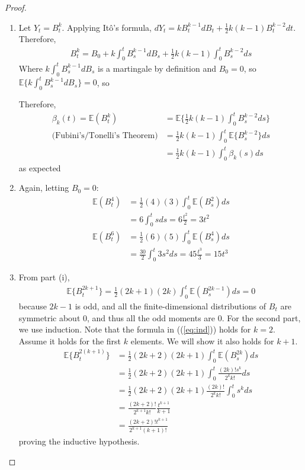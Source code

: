 \documentclass[11pt]{article}
\newcommand{\gb}{\beta}
\newcommand{\E}{\mathbb{E}}
\let\oldref\ref
\renewcommand{\ref}[1]{(\oldref{#1})}
\begin{document}
\begin{proof}$ $\newline
\begin{enumerate}
\item Let $Y_t=B_t^k$.  Applying It\^o's formula, $dY_t = kB_t^{k-1} dB_t + \frac{1}{2}k(k-1)B_t^{k-2} dt$. Therefore,
\begin{align*}
B_t^k =B_0+ k \int_0^t B_s^{k-1} dB_s + \frac{1}{2}k(k-1) \int_0^t B_s^{k-2} ds
\end{align*}
Where $k \int_0^t B_s^{k-1} dB_s $ is a martingale by definition and $B_0=0$, so $\E \big\{ k \int_0^t B_s^{k-1} dB_s \big\}=0$, so

Therefore,
\begin{align*}
\gb_k(t)=\E(B_t^k) &= \E \Big\{ \frac{1}{2}k(k-1) \int_0^t B_s^{k-2} ds \Big\}\\
\text{(Fubini's/Tonelli's Theorem)}&= \frac{1}{2}k(k-1) \int_0^t \E\{ B_s^{k-2}\} ds\\
&= \frac{1}{2}k(k-1) \int_0^t \gb_k(s) ds
\end{align*}
as expected 
\item Again, letting $B_0=0$:
\begin{align*}
\E(B_t^4) &= \frac{1}{2}(4)(3) \int_0^t \E(B_s^2) ds\\
&= 6 \int_0^t s ds = 6\frac{t^2}{2}= 3 t^2
\end{align*}
\begin{align*}
\E(B_t^6)&= \frac{1}{2}(6)(5)\int_0^t \E(B_s^4) ds \\
&= \frac{30}{2} \int_0^t 3s^2 ds = 45 \frac{t^3}{3}= 15t^3
\end{align*}
\item 
From part (i), 
\begin{align*}
\E\{ B_t^{2k+1}\} = \frac{1}{2}(2k+1)(2k) \int_0^t \E(B_s^{2k-1}) ds=0
\end{align*}
because $2k-1$ is odd, and all the finite-dimensional distributions of $B_t$ are symmetric about 0, and thus all the odd moments are $0$.  For the second part, we use induction.  Note that the formula in (\ref{eq:ind}) holds for $k=2$.  Assume it holds for the first $k$ elements.  We will show it also holds for $k+1$.
\begin{align*}
\E\{ B_t^{2(k+1)}\}&= \frac{1}{2}(2k+2)(2k+1) \int_0^t \E(B_s^{2k}) ds\\
&= \frac{1}{2}(2k+2)(2k+1)\int_0^t \frac{(2k)!s^k}{2^kk!} ds \\
&= \frac{1}{2}(2k+2)(2k+1)\frac{(2k)!}{2^kk!}\int_0^t s^k ds\\
&= \frac{(2k+2)!}{2^{k+1} k!} \frac{t^{k+1}}{k+1}\\
&= \frac{(2k+2)!t^{k+1}}{2^{k+1} (k+1)!}
\end{align*}
proving the inductive hypothesis.
\end{enumerate}
\end{proof}
\end{document}
